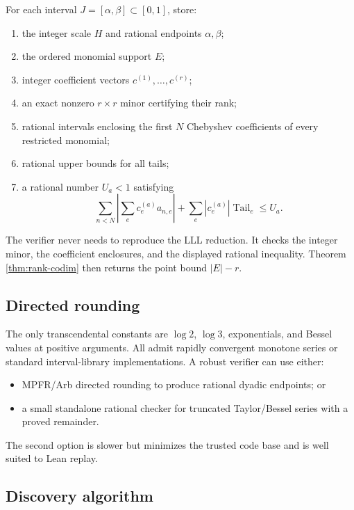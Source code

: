 \documentclass[11pt,oneside]{article}
\theoremstyle{definition}
\theoremstyle{remark}
\begin{document}
For each interval $J=[\alpha,\beta]\subset[0,1]$, store:

\begin{enumerate}
\item the integer scale $H$ and rational endpoints $\alpha,\beta$;
\item the ordered monomial support $E$;
\item integer coefficient vectors $c^{(1)},\ldots,c^{(r)}$;
\item an exact nonzero $r\times r$ minor certifying their rank;
\item rational intervals enclosing the first $N$ Chebyshev coefficients of every restricted
monomial;
\item rational upper bounds for all tails;
\item a rational number $U_a<1$ satisfying
\[
 \sum_{n<N}\left|\sum_ec^{(a)}_e a_{n,e}\right|
 +\sum_e|c^{(a)}_e|\operatorname{Tail}_e\le U_a.
\]
\end{enumerate}

The verifier never needs to reproduce the LLL reduction.  It checks the integer minor, the
coefficient enclosures, and the displayed rational inequality.  Theorem
\ref{thm:rank-codim} then returns the point bound $|E|-r$.

\subsection{Directed rounding}

The only transcendental constants are $\log2$, $\log3$, exponentials, and Bessel values at
positive arguments.  All admit rapidly convergent monotone series or standard interval-library
implementations.  A robust verifier can use either:

\begin{itemize}
\item MPFR/Arb directed rounding to produce rational dyadic endpoints; or
\item a small standalone rational checker for truncated Taylor/Bessel series with a proved
remainder.
\end{itemize}

The second option is slower but minimizes the trusted code base and is well suited to Lean
replay.

\subsection{Discovery algorithm}
\end{document}
